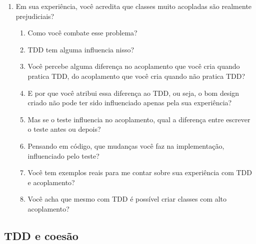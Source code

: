 \begin{enumerate}
	\item{Em sua experiência, você acredita que classes muito acopladas são realmente prejudiciais?}
		\begin{enumerate}
			\item Como você combate esse problema?

			\item TDD tem alguma influencia nisso?
			
			\item Você percebe alguma diferença no acoplamento que você cria quando
			pratica TDD, do acoplamento que você cria quando não pratica TDD?
			
			\item E por que você atribui essa diferença ao TDD, ou seja, o bom design
			criado não pode ter sido influenciado apenas pela sua experiência?
			
			\item Mas se o teste influencia no acoplamento, 
			qual a diferença entre escrever o teste antes ou depois?

			\item Pensando em código, que mudanças você faz na implementação, influenciado
			pelo teste?
			
			\item Você tem exemplos reais para me contar sobre sua experiência com TDD e 
			acoplamento?
			
			\item Você acha que mesmo com TDD é possível criar classes com alto acoplamento? 
		\end{enumerate}
\end{enumerate}

\subsection{TDD e coesão}
\label{entrevista:coesao}

